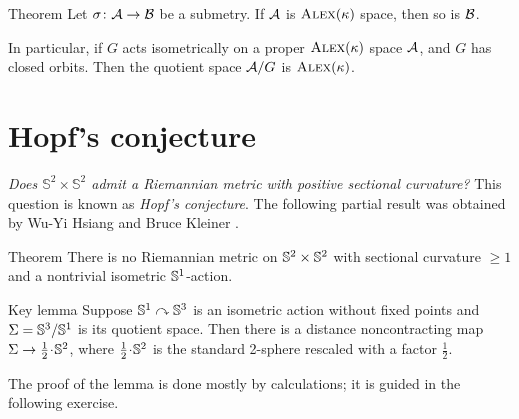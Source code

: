 \begin{thm}{Theorem}\label{thm:submetry-CBB-1}
Let $\sigma\colon\mathcal{A}\to\mathcal{B}$ be a submetry.
If $\mathcal{A}$ is $\textsc{Alex}(\kappa)$ space, then so is $\mathcal{B}$.

In particular, if $G$ acts isometrically on a proper $\textsc{Alex}(\kappa)$ space $\mathcal{A}$, and $G$ has closed orbits.
Then the quotient space $\mathcal{A}/G$ is $\textsc{Alex}(\kappa)$.
\end{thm}

\section{Hopf's conjecture}

\textit{Does $\mathbb{S}^2\times\mathbb{S}^2$ admit a Riemannian metric with positive sectional curvature?}
This question is known as \emph{Hopf's conjecture}.
The following partial result was obtained by Wu-Yi Hsiang and Bruce Kleiner \cite{hsiang-kleiner}.

\begin{thm}{Theorem}\label{thm:hsiang-kleiner}
There is no Riemannian metric on $\mathbb{S}^2\times\mathbb{S}^2$ with sectional curvature $\ge 1$ and a nontrivial isometric $\mathbb{S}^1$-action.
\end{thm}


\begin{thm}{Key lemma}\label{lem:S^3/S^1}
Suppose $\mathbb{S}^1\curvearrowright\mathbb{S}^3$ is an isometric action without fixed points 
and $\Sigma=\mathbb{S}^3/\mathbb{S}^1$ is its quotient space.
Then there is a distance noncontracting map $\Sigma\to \tfrac12\cdot \SSS^2$, where $\tfrac12\cdot \SSS^2$ is the standard 2-sphere rescaled with a factor $\tfrac12$.
\end{thm}

The proof of the lemma is done mostly by calculations;
it is guided in the following exercise.


